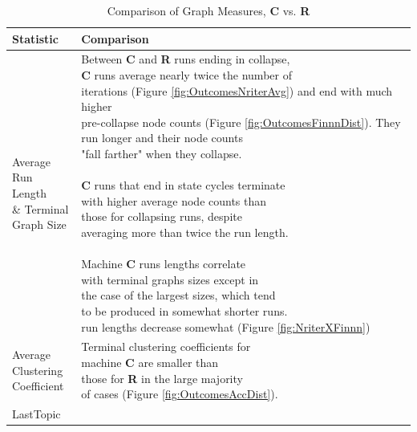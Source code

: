\documentclass{tufte-handout}
\begin{document}
\clearpage

\begin{table}
\centering
\caption{Comparison of Graph Measures, \textbf{C} vs. \textbf{R}}
\begin{tabular}{ll}\toprule
\addlinespace[3mm]
Statistic  & Comparison \\ \midrule
\addlinespace[2mm]

\makecell[tl]{
Average \\%
Run Length \\%
\& Terminal \\%
Graph Size} &
\makecell[tl]{
Between \textbf{C} and \textbf{R} runs ending in collapse, \\%
\textbf{C} runs average nearly twice the number of \\%
iterations (Figure \ref{fig:OutcomesNriterAvg}) and end with much higher \\%
pre-collapse node counts (Figure \ref{fig:OutcomesFinnnDist}). They \\%
run longer and their node counts \\%
"fall farther" when they collapse. \\%
\\%
\textbf{C} runs that end in state cycles terminate \\%
with higher average node counts than \\%
those for collapsing runs, despite \\%
averaging more than twice the run length. \\%
\\%
Machine \textbf{C} runs lengths correlate \\%
with terminal graphs sizes except in \\%
the case of the largest sizes, which tend \\%
to be produced in somewhat shorter runs. \\%
run lengths decrease somewhat (Figure \ref{fig:NriterXFinnn})} \\

\vspace{2mm}
\makecell[tl]{
Average \\%
Clustering \\%
Coefficient} &
\makecell[tl]{
Terminal clustering coefficients for \\%
machine \textbf{C} are smaller than \\%
those for \textbf{R} in the large majority \\%
of cases (Figure \ref{fig:OutcomesAccDist}).} \\

\vspace{2mm}
LastTopic & \\ \bottomrule
\end{tabular}
\label{tab:TabQ}
\end{table}
\end{document}
